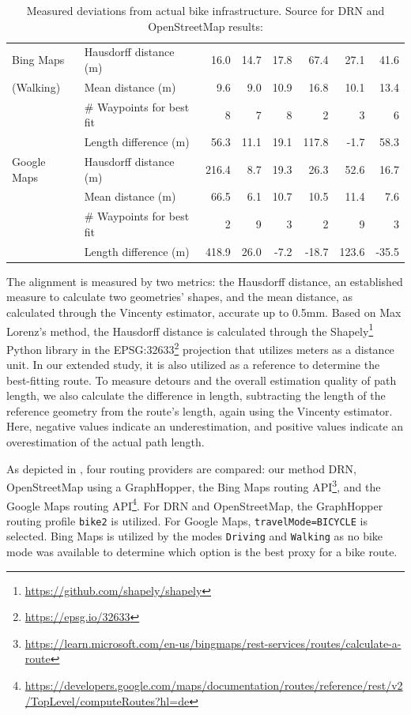 \begin{table}[t]
{\begin{tabular}{@{}llrrrrrr@{}}
\hline
Bing Maps & Hausdorff distance (m) & 16.0 & 14.7 & 17.8 & 67.4 & 27.1 & 41.6 \\
(Walking) & Mean distance (m) & 9.6 & 9.0 & 10.9 & 16.8 & 10.1 & 13.4 \\
 & \# Waypoints for best fit & 8 & 7 & 8 & 2 & 3 & 6 \\
 & Length difference (m) & 56.3 & 11.1 & 19.1 & 117.8 & -1.7 & 58.3 \\
\hline
Google Maps & Hausdorff distance (m) & 216.4 & 8.7 & 19.3 & 26.3 & 52.6 & 16.7 \\
 & Mean distance (m) & 66.5 & 6.1 & 10.7 & 10.5 & 11.4 & 7.6 \\
 & \# Waypoints for best fit & 2 & 9 & 3 & 2 & 9 & 3 \\
 & Length difference (m) & 418.9 & 26.0 & -7.2 & -18.7 & 123.6 & -35.5 \\
\bottomrule
\end{tabular}
}
\caption{Measured deviations from actual bike infrastructure. Source for DRN and OpenStreetMap results: \cite{lorenz_2022}}%
\label{tab:accuracy-comparison}%
\end{table}

The alignment is measured by two metrics: the Hausdorff distance, an established measure to calculate two geometries' shapes, and the mean distance, as calculated through the Vincenty estimator, accurate up to 0.5mm. Based on Max Lorenz's \cite{lorenz_2022} method, the Hausdorff distance is calculated through the Shapely\footnote{\url{https://github.com/shapely/shapely}} Python library in the EPSG:32633\footnote{\url{https://epsg.io/32633}} projection that utilizes meters as a distance unit. In our extended study, it is also utilized as a reference to determine the best-fitting route. To measure detours and the overall estimation quality of path length, we also calculate the difference in length, subtracting the length of the reference geometry from the route's length, again using the Vincenty estimator. Here, negative values indicate an underestimation, and positive values indicate an overestimation of the actual path length.

As depicted in , four routing providers are compared: our method DRN, OpenStreetMap using a GraphHopper, the Bing Maps routing API\footnote{\url{https://learn.microsoft.com/en-us/bingmaps/rest-services/routes/calculate-a-route}}, and the Google Maps routing API\footnote{\url{https://developers.google.com/maps/documentation/routes/reference/rest/v2/TopLevel/computeRoutes?hl=de}}. For DRN and OpenStreetMap, the GraphHopper routing profile \texttt{bike2} is utilized. For Google Maps, \texttt{travelMode=\allowbreak BICYCLE} is selected. Bing Maps is utilized by the modes \texttt{Driving} and \texttt{Walking} as no bike mode was available to determine which option is the best proxy for a bike route.

